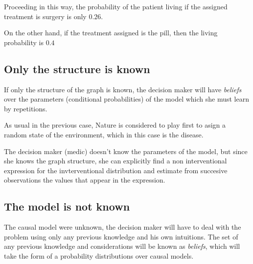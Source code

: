 \documentclass{article}
\begin{document}
Proceeding in this way, the probability of the patient living if the assigned treatment is surgery is only $0.26$.

On the other hand, if the treatment assigned is the pill, then the living probability is $0.4$
\subsection{Only the structure is known}
If only the structure of the graph is known, the decision maker will have \textit{beliefs} over the parameters (conditional probabilities) of the model which she must learn by repetitions.

As usual in the previous case, Nature is considered to play first to asign a random state of the environment, which in this case is the disease.

The decision maker (medic) doesn't know the parameters of the model, but since she knows the graph structure, she can explicitly find a non interventional expression for the invterventional distribution and estimate from succesive observations the values that appear in the expression.

\subsection{The model is not known}
The causal model were unknown, the decision maker will have to deal with the problem using only any previous knowledge and his own intuitions. The set of any previous knowledge and considerations will be known as \textit{beliefs}, which will take the form of a probability distributions over causal models. 



\end{document}
